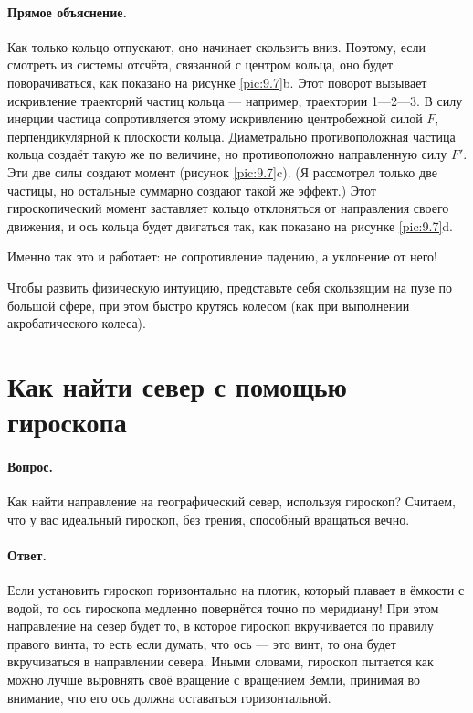 \paragraph{Прямое объяснение.}
Как только кольцо отпускают, оно начинает скользить вниз.
Поэтому, если смотреть из системы отсчёта, связанной с центром кольца, оно будет поворачиваться, как показано на рисунке \ref{pic:9.7}b.
Этот поворот вызывает искривление траекторий частиц кольца --- например, траектории 1---2---3.
В силу инерции частица сопротивляется этому искривлению центробежной силой $F$, перпендикулярной к плоскости кольца.
Диаметрально противоположная частица кольца создаёт такую же по величине, но противоположно направленную силу $F'$.
Эти две силы создают момент (рисунок \ref{pic:9.7}c).
(Я рассмотрел только две частицы, но остальные суммарно создают такой же эффект.)
Этот гироскопический момент заставляет кольцо отклоняться от направления своего движения, и ось кольца будет двигаться так, как показано на рисунке \ref{pic:9.7}d.

Именно так это и работает: не сопротивление падению, а уклонение от него!

Чтобы развить физическую интуицию, представьте себя скользящим на пузе по большой сфере, при этом быстро крутясь колесом (как при выполнении акробатического колеса).

\section{Как найти север с помощью гироскопа}

\paragraph{Вопрос.}
Как найти направление на географический север, используя гироскоп?
Считаем, что у вас идеальный гироскоп, без трения, способный вращаться вечно.

\paragraph{Ответ.}
Если установить гироскоп горизонтально на плотик, который плавает в ёмкости с водой,
то ось гироскопа медленно повернётся точно по меридиану!
При этом направление на север будет то, в которое гироскоп вкручивается по правилу правого винта, то есть если думать, что ось --- это винт, то она будет вкручиваться в направлении севера.
Иными словами, гироскоп пытается как можно лучше выровнять своё вращение с вращением Земли, принимая во внимание, что его ось должна оставаться горизонтальной.

